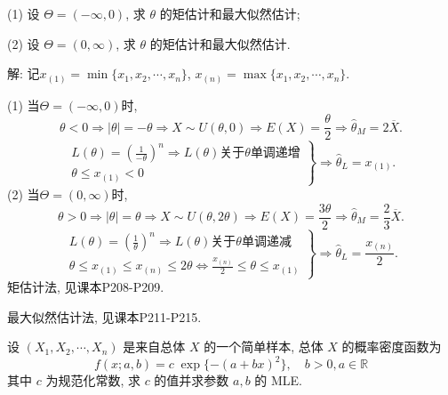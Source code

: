 \documentclass[standard]{ExBook}
\renewenvironment{shaded}{%
  \def\FrameCommand{\fboxsep=\FrameSep \colorbox{shadecolor}}%
  \MakeFramed{\advance\hsize-\width \FrameRestore}%
}{%
  \endMakeFramed
}
\begin{document}
\begin{qitems}
\begin{bbox}
\begin{shaded}
(1) 设 \(\Theta = (-\infty, 0)\), 求 \(\theta\) 的矩估计和最大似然估计;

(2) 设 \(\Theta = (0, \infty)\), 求 \(\theta\) 的矩估计和最大似然估计.
    \end{shaded}
    \end{bbox}

\vspace{\dimexpr2.5cm-5em\relax}

解: 记$x_{(1)}=\min\{x_1,x_2,\cdots,x_n\}$, $x_{(n)}=\max\{x_1,x_2,\cdots,x_n\}$.

(1) 当$\Theta=(-\infty,0)$时, 
$$
\theta<0
\Longrightarrow
|\theta|=-\theta
\Longrightarrow
X\sim U(\theta,0)
\Longrightarrow
E(X)=\frac{\theta}{2}
\Longrightarrow
\hat{\theta}_{M}=2\overline{X}.
$$
$$
\left.
\begin{array}{r}
L(\theta)=\left(\frac{1}{-\theta}\right)^n
\Longrightarrow
L(\theta)\text{关于}\theta\text{单调递增}\\
\theta\leq x_{(1)}<0
\end{array}
\right\}
\Longrightarrow
\hat{\theta}_{L}=x_{(1)}.
$$
(2) 当$\Theta=(0,\infty)$时,
$$
\theta>0
\Longrightarrow
|\theta|=\theta
\Longrightarrow
X\sim U(\theta,2\theta)
\Longrightarrow
E(X)=\frac{3\theta}{2}
\Longrightarrow
\hat{\theta}_{M}=\frac{2}{3}\overline{X}.
$$
$$
\left.
\begin{array}{r}
L(\theta)=\left(\frac{1}{\theta}\right)^n
\Longrightarrow
L(\theta)\text{关于}\theta\text{单调递减}\\
\theta \leq x_{(1)} \leq x_{(n)} \leq 2\theta
\Longleftrightarrow
\frac{x_{(n)}}{2}\leq\theta\leq x_{(1)}
\end{array}
\right\}
\Longrightarrow
\hat{\theta}_{L}=\frac{x_{(n)}}{2}.
$$
\textcolor{themeColor}{\selectfont {} 矩估计法, 见课本P208-P209.}

\textcolor{themeColor}{\selectfont {} 最大似然估计法, 见课本P211-P215.}

\vspace{2.5cm-5em}

    \begin{bbox}
    \begin{shaded}
        \qitem
设 \((X_1, X_2, \cdots, X_n)\) 是来自总体 \(X\) 的一个简单样本, 总体 \(X\) 的概率密度函数为
\[f(x; a, b) = c \; \exp\{-(a + bx)^2\}, \quad b > 0, a \in \mathbb{R}\]
其中 \(c\) 为规范化常数, 求 \(c\) 的值并求参数 \(a, b\) 的 MLE.
    \end{shaded}
    \end{bbox}


\end{qitems}
\end{document}

